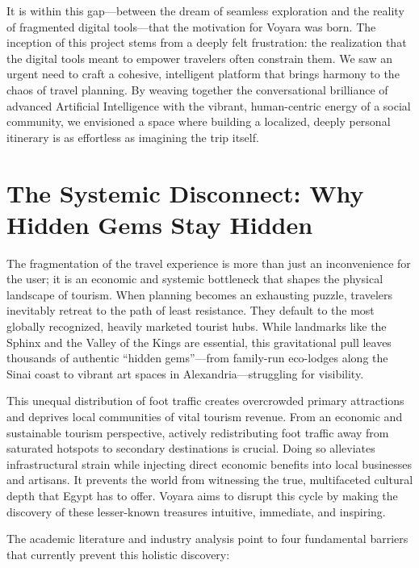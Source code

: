 It is within this gap---between the dream of seamless exploration and the reality of fragmented digital tools---that the motivation for Voyara was born. The inception of this project stems from a deeply felt frustration: the realization that the digital tools meant to empower travelers often constrain them. We saw an urgent need to craft a cohesive, intelligent platform that brings harmony to the chaos of travel planning. By weaving together the conversational brilliance of advanced Artificial Intelligence with the vibrant, human-centric energy of a social community, we envisioned a space where building a localized, deeply personal itinerary is as effortless as imagining the trip itself.

\section{The Systemic Disconnect: Why Hidden Gems Stay Hidden}
The fragmentation of the travel experience is more than just an inconvenience for the user; it is an economic and systemic bottleneck that shapes the physical landscape of tourism. When planning becomes an exhausting puzzle, travelers inevitably retreat to the path of least resistance. They default to the most globally recognized, heavily marketed tourist hubs. While landmarks like the Sphinx and the Valley of the Kings are essential, this gravitational pull leaves thousands of authentic ``hidden gems''---from family-run eco-lodges along the Sinai coast to vibrant art spaces in Alexandria---struggling for visibility. 

This unequal distribution of foot traffic creates overcrowded primary attractions and deprives local communities of vital tourism revenue. From an economic and sustainable tourism perspective, actively redistributing foot traffic away from saturated hotspots to secondary destinations is crucial. Doing so alleviates infrastructural strain while injecting direct economic benefits into local businesses and artisans. It prevents the world from witnessing the true, multifaceted cultural depth that Egypt has to offer. Voyara aims to disrupt this cycle by making the discovery of these lesser-known treasures intuitive, immediate, and inspiring. 

The academic literature and industry analysis point to four fundamental barriers that currently prevent this holistic discovery:


